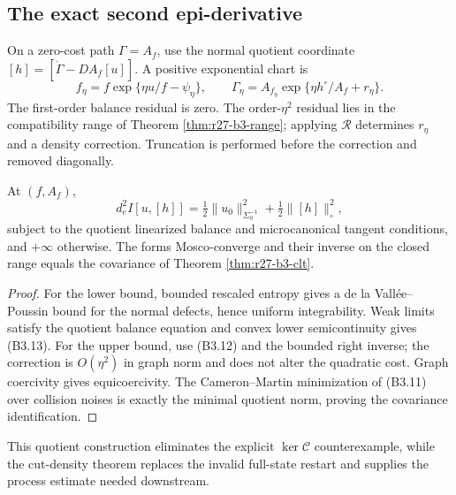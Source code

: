 \subsection{The exact second epi-derivative}

On a zero-cost path $\Gamma=A_f$, use the normal quotient coordinate
$[h]=[\dot\Gamma-D A_f[u]]$.  A positive exponential chart is
\[
 f_\eta=f\exp\{\eta u/f-\psi_\eta\},\qquad
 \Gamma_\eta=A_{f_\eta}
 \exp\{\eta h^\circ/A_f+r_\eta\}.                         \tag{B3.12}
\]
The first-order balance residual is zero.  The order-$\eta^2$ residual lies
in the compatibility range of Theorem \ref{thm:r27-b3-range}; applying
$\mathcal R$ determines $r_\eta$ and a density correction.  Truncation is
performed before the correction and removed diagonally.

\begin{theorem}
\label{thm:r27-b3-mosco}
At $(f,A_f)$,
\[
 d_e^2I[u,[h]]
 =\tfrac12\|u_0\|_{\Sigma_0^{-1}}^2
  +\tfrac12\|[h]\|_\circ^2,                               \tag{B3.13}
\]
subject to the quotient linearized balance and microcanonical tangent
conditions, and $+\infty$ otherwise.  The forms Mosco-converge and their
inverse on the closed range equals the covariance of Theorem
\ref{thm:r27-b3-clt}.
\end{theorem}

\begin{proof}
For the lower bound, bounded rescaled entropy gives a de la
Vall\'ee--Poussin bound for the normal defects, hence uniform integrability.
Weak limits satisfy the quotient balance equation and convex lower
semicontinuity gives (B3.13).  For the upper bound, use (B3.12) and the bounded
right inverse; the correction is $O(\eta^2)$ in graph norm and does not alter
the quadratic cost.  Graph coercivity gives equicoercivity.  The
Cameron--Martin minimization of (B3.11) over collision noises is exactly the
minimal quotient norm, proving the covariance identification.
\end{proof}

This quotient construction eliminates the explicit $\ker\mathcal C$
counterexample, while the cut-density theorem replaces the invalid full-state
restart and supplies the process estimate needed downstream.
